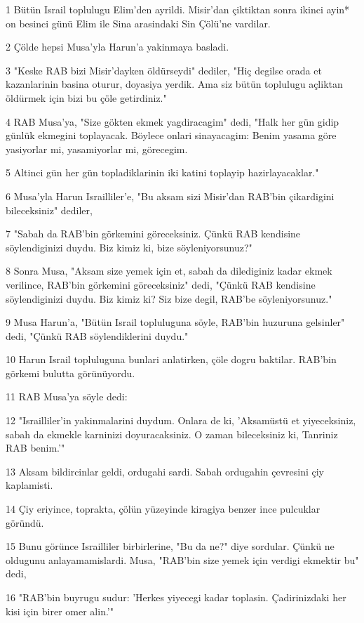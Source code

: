 \par 1 Bütün Israil toplulugu Elim'den ayrildi. Misir'dan çiktiktan sonra ikinci ayin* on besinci günü Elim ile Sina arasindaki Sin Çölü'ne vardilar.
\par 2 Çölde hepsi Musa'yla Harun'a yakinmaya basladi.
\par 3 "Keske RAB bizi Misir'dayken öldürseydi" dediler, "Hiç degilse orada et kazanlarinin basina oturur, doyasiya yerdik. Ama siz bütün toplulugu açliktan öldürmek için bizi bu çöle getirdiniz."
\par 4 RAB Musa'ya, "Size gökten ekmek yagdiracagim" dedi, "Halk her gün gidip günlük ekmegini toplayacak. Böylece onlari sinayacagim: Benim yasama göre yasiyorlar mi, yasamiyorlar mi, görecegim.
\par 5 Altinci gün her gün topladiklarinin iki katini toplayip hazirlayacaklar."
\par 6 Musa'yla Harun Israilliler'e, "Bu aksam sizi Misir'dan RAB'bin çikardigini bileceksiniz" dediler,
\par 7 "Sabah da RAB'bin görkemini göreceksiniz. Çünkü RAB kendisine söylendiginizi duydu. Biz kimiz ki, bize söyleniyorsunuz?"
\par 8 Sonra Musa, "Aksam size yemek için et, sabah da dilediginiz kadar ekmek verilince, RAB'bin görkemini göreceksiniz" dedi, "Çünkü RAB kendisine söylendiginizi duydu. Biz kimiz ki? Siz bize degil, RAB'be söyleniyorsunuz."
\par 9 Musa Harun'a, "Bütün Israil topluluguna söyle, RAB'bin huzuruna gelsinler" dedi, "Çünkü RAB söylendiklerini duydu."
\par 10 Harun Israil topluluguna bunlari anlatirken, çöle dogru baktilar. RAB'bin görkemi bulutta görünüyordu.
\par 11 RAB Musa'ya söyle dedi:
\par 12 "Israilliler'in yakinmalarini duydum. Onlara de ki, 'Aksamüstü et yiyeceksiniz, sabah da ekmekle karninizi doyuracaksiniz. O zaman bileceksiniz ki, Tanriniz RAB benim.'"
\par 13 Aksam bildircinlar geldi, ordugahi sardi. Sabah ordugahin çevresini çiy kaplamisti.
\par 14 Çiy eriyince, toprakta, çölün yüzeyinde kiragiya benzer ince pulcuklar göründü.
\par 15 Bunu görünce Israilliler birbirlerine, "Bu da ne?" diye sordular. Çünkü ne oldugunu anlayamamislardi. Musa, "RAB'bin size yemek için verdigi ekmektir bu" dedi,
\par 16 "RAB'bin buyrugu sudur: 'Herkes yiyecegi kadar toplasin. Çadirinizdaki her kisi için birer omer alin.'"
